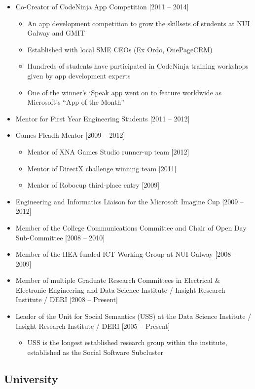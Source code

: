 \documentclass[10pt,a4paper]{res} %
\begin{document}
\begin{resume}
\begin{itemize}
\item Co-Creator of CodeNinja App Competition [2011 -- 2014]
\begin{itemize} \itemsep -2pt
\item An app development competition to grow the skillsets of students at NUI Galway and GMIT
\item Established with local SME CEOs (Ex Ordo, OnePageCRM)
\item Hundreds of students have participated in CodeNinja training workshops given by app development experts
\item One of the winner's iSpeak app went on to feature worldwide as Microsoft's ``App of the Month''
\end{itemize}
\item Mentor for First Year Engineering Students [2011 -- 2012]
\item Games Fleadh Mentor [2009 -- 2012]
\begin{itemize} \itemsep -2pt
\item Mentor of XNA Games Studio runner-up team [2012]
\item Mentor of DirectX challenge winning team [2011] 
\item Mentor of Robocup third-place entry [2009]
\end{itemize}
\item Engineering and Informatics Liaison for the Microsoft Imagine Cup [2009 -- 2012]
\item Member of the College Communications Committee and Chair of Open Day Sub-Committee [2008 -- 2010]
\item Member of the HEA-funded ICT Working Group at NUI Galway [2008 -- 2009]
\item Member of multiple Graduate Research Committees in Electrical \& Electronic Engineering and Data Science Institute / Insight Research Institute / DERI [2008 -- Present]
\item Leader of the Unit for Social Semantics (USS) at the Data Science Institute / Insight Research Institute / DERI [2005 -- Present]
\begin{itemize} \itemsep -2pt
\item USS is the longest established research group within the institute, established as the Social Software Subcluster
\end{itemize}
\end{itemize}

\subsection*{University}


\end{resume}
\end{document}
